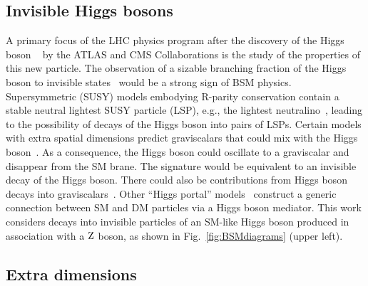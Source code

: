 \subsection{Invisible Higgs bosons}

A primary focus of the LHC physics program after the discovery of the Higgs boson ~\cite{AtlasPaperCombination,CMSPaperCombination} by
the ATLAS and CMS Collaborations is the study of the properties of this new particle. The observation of a sizable branching
fraction of the Higgs boson to invisible states~\cite{Ghosh:2012ep,Martin:1999qf,Bai:2011wz} would be a strong sign
of BSM physics.  Supersymmetric (SUSY) models embodying R-parity conservation contain a stable neutral lightest SUSY
particle (LSP), e.g., the lightest neutralino~\cite{Belanger:2001am}, leading to the possibility of decays of the Higgs boson into pairs of LSPs.
Certain models with extra spatial dimensions predict graviscalars that could mix with the
Higgs boson~\cite{Giudice:2000av}.  As a consequence, the Higgs boson could oscillate
to a graviscalar and disappear from the SM brane. The signature would be
equivalent to an invisible decay of the Higgs boson. There could also be contributions
from Higgs boson decays into graviscalars~\cite{Battaglia:2004js}.
Other ``Higgs portal'' models~\cite{Baek:2012se,Djouadi:2011aa,Djouadi:2012zc} construct
a generic connection between SM and DM particles via a Higgs boson mediator.
This work considers decays into invisible particles of an SM-like Higgs boson produced in association with a $\mathrm{Z}$ boson, as shown in Fig.~\ref{fig:BSMdiagrams} (upper left).

\subsection{Extra dimensions}


